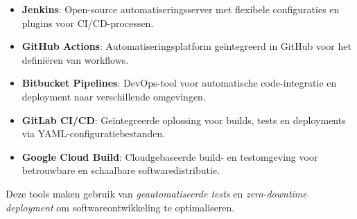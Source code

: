 \begin{itemize}
    \item \textbf{Jenkins}: Open-source automatiseringsserver met flexibele configuraties en plugins voor CI/CD-processen.
    \item \textbf{GitHub Actions}: Automatiseringsplatform geïntegreerd in GitHub voor het definiëren van workflows.
    \item \textbf{Bitbucket Pipelines}: DevOps-tool voor automatische code-integratie en deployment naar verschillende omgevingen.
    \item \textbf{GitLab CI/CD}: Geïntegreerde oplossing voor builds, tests en deployments via YAML-configuratiebestanden.
    \item \textbf{Google Cloud Build}: Cloudgebaseerde build- en testomgeving voor betrouwbare en schaalbare softwaredistributie.
\end{itemize}

Deze tools maken gebruik van \textit{geautomatiseerde tests} en \textit{zero-downtime deployment} om softwareontwikkeling te optimaliseren.

